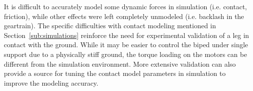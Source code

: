 It is difficult to accurately model some dynamic forces in simulation (i.e. contact, friction), while other effects were left completely unmodeled (i.e. backlash in the geartrain). The specific difficulties with contact modeling mentioned in Section~\ref{sub:simulations} reinforce the need for experimental validation of a leg in contact with the ground. While it may be easier to control the biped under single support due to a physically stiff ground, the torque loading on the motors can be different from the simulation environment. More extensive validation can also provide a source for tuning the contact model parameters in simulation to improve the modeling accuracy. 







